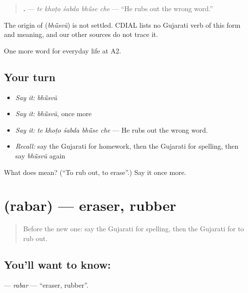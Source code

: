 \begin{quote}
\textbf{    .} — \emph{te khoṭo śabda bhū̃se che} — \textquotedblleft{}He rubs out the wrong word.\textquotedblright{}
\end{quote}

\begin{cousinweb}
The origin of \textbf{} (\emph{bhū̃svũ}) is not settled. CDIAL lists no Gujarati verb of this form and meaning, and our other sources do not trace it.
\end{cousinweb}

\begin{grammarlens}[title={What you've built}]
One more word for everyday life at A2.
\end{grammarlens}

\subsection*{Your turn}
\begin{itemize}
\raggedright
  \item \emph{Say it:} \emph{bhū̃svũ}
  \item \emph{Say it:} \emph{bhū̃svũ}, once more
  \item \emph{Say it:} \emph{te khoṭo śabda bhū̃se che} — He rubs out the wrong word.
  \item \emph{Recall:} say the Gujarati for homework, then the Gujarati for spelling, then say \emph{bhū̃svũ} again
\end{itemize}

\begin{tcolorbox}[breakable,colback=teal!4,colframe=teal!35!black,title={Before you move on}]
What does  mean? (\textquotedblleft{}To rub out, to erase\textquotedblright{}.) Say it once more.
\end{tcolorbox}
\section[\texorpdfstring{\gu{રબર} (rabar)}{રબર (rabar)}]{ (rabar) — eraser, rubber}

\label{lesson:GU-C245-rabar}



\begin{quote}
Before the new one: say the Gujarati for spelling, then the Gujarati for to rub out.
\end{quote}

\subsection*{You'll want to know: }
\textbf{} — \emph{rabar} — \textquotedblleft{}eraser, rubber\textquotedblright{}.

